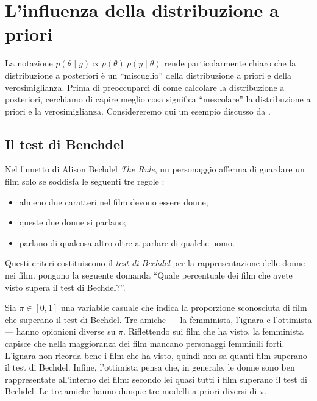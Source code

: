 \documentclass[
  11pt,
]{krantz}
\providecommand{\tightlist}{%
  \setlength{\itemsep}{0pt}\setlength{\parskip}{0pt}}
\theoremstyle{definition}
\theoremstyle{definition}
\theoremstyle{definition}
\theoremstyle{definition}
\theoremstyle{remark}
\begin{document}
\hypertarget{chapter-balance}{%
\chapter{L'influenza della distribuzione a priori}\label{chapter-balance}}

La notazione \(p(\theta \mid y) \propto p(\theta) \ p(y \mid \theta)\) rende particolarmente chiaro che la distribuzione a posteriori è un ``miscuglio'' della distribuzione a priori e della verosimiglianza. Prima di preoccuparci di come calcolare la distribuzione a posteriori, cerchiamo di capire meglio cosa significa ``mescolare'' la distribuzione a priori e la verosimiglianza. Considereremo qui un esempio discusso da \citet{Johnson2022bayesrules}.

\hypertarget{il-test-di-benchdel}{%
\section{Il test di Benchdel}\label{il-test-di-benchdel}}

Nel fumetto di Alison Bechdel \emph{The Rule}, un personaggio afferma di guardare un film solo se soddisfa le seguenti tre regole \citep{Bechdel1986dykes}:

\begin{itemize}
\tightlist
\item
  almeno due caratteri nel film devono essere donne;
\item
  queste due donne si parlano;
\item
  parlano di qualcosa altro oltre a parlare di qualche uomo.
\end{itemize}

Questi criteri costituiscono il \emph{test di Bechdel} per la rappresentazione delle donne nei film. \citet{Johnson2022bayesrules} pongono la seguente domanda ``Quale percentuale dei film che avete visto supera il test di Bechdel?''.

Sia \(\pi \in [0, 1]\) una variabile casuale che indica la proporzione sconosciuta di film che superano il test di Bechdel. Tre amiche --- la femminista, l'ignara e l'ottimista --- hanno opionioni diverse su \(\pi\). Riflettendo sui film che ha visto, la femminista capisce che nella maggioranza dei film mancano personaggi femminili forti. L'ignara non ricorda bene i film che ha visto, quindi non sa quanti film superano il test di Bechdel. Infine, l'ottimista pensa che, in generale, le donne sono ben rappresentate all'interno dei film: secondo lei quasi tutti i film superano il test di Bechdel. Le tre amiche hanno dunque tre modelli a priori diversi di \(\pi\).
\end{document}
